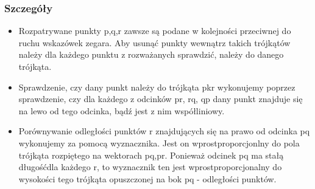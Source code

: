 \documentclass[11pt]{article}
\theoremstyle{remark} \newtheorem{definition}{def.}
\theoremstyle{definition} \newtheorem{twierdzenie}{tw.}
\begin{document}
    \subsubsection{Szczegóły}  
    \begin{itemize}
        \item   Rozpatrywane punkty p,q,r zawsze są podane w kolejności przeciwnej do ruchu wskazówek zegara.
                Aby usunąć punkty wewnątrz takich trójkątów należy dla każdego punktu z rozważanych sprawdzić,
                należy do danego trójkąta. 
        \item   Sprawdzenie, czy dany punkt należy do trójkąta pkr wykonujemy poprzez sprawdzenie, czy dla każdego
                z odcinków pr, rq, qp dany punkt znajduje się na lewo od tego odcinka, bądź jest z nim współliniowy.
        \item   Porównywanie odległości punktów r znajdujących się na prawo od odcinka pq wykonujemy za pomocą
                wyznacznika. Jest on wprostproporcjonlny do pola trójkąta rozpiętego na wektorach pq,pr. Ponieważ 
                odcinek pq ma stałą długośćdla każdego r, to wyznacznik ten jest wprostproporcjonalny do wysokości tego
                trójkąta opuszczonej na bok pq - odległości punktów.
    \end{itemize}     
\end{document}
